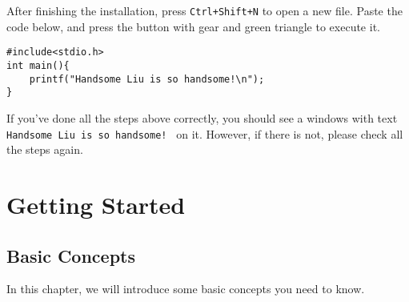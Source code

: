 \documentclass{report}
\begin{document}
    After finishing the installation, press \texttt{Ctrl+Shift+N} to open a new file. Paste the code below, and press the button with gear and green triangle to execute it.

\begin{lstlisting}[style=CStyle]
#include<stdio.h>
int main(){
    printf("Handsome Liu is so handsome!\n");
}
\end{lstlisting}

    If you've done all the steps above correctly, you should see a windows with text \texttt{ Handsome Liu is so handsome! } on it. However, if there is not, please check all the steps again.

\part{Getting Started}
\chapter{Basic Concepts}
    In this chapter, we will introduce some basic concepts you need to know.
    \section{}
\end{document}
